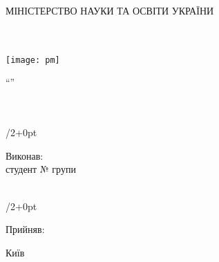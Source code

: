 
\newlength{\rightshift}
\setlength{\rightshift}{35pt}

\thispagestyle{empty}

{\sffamily
\begin{Center}
	{\LARGE{}МІНІСТЕРСТВО НАУКИ ТА ОСВІТИ УКРАЇНИ\\
	\university{}\\}
	{\Large\faculty{}\\\department{}}
\end{Center}

\vspace*{\fill}

\begin{Center}
	\texttt{[image: pm]}\\
\end{Center}

\vspace*{\fill}

\begin{Center}
	\Large
	\enquote{\subjectname}\\
	\jobtitle{} \prodnumber{}\\
	\proddate{}\\
\end{Center}

\vspace*{\fill}

\begin{adjustwidth}{\textwidth/2+\rightshift}{0pt}
	\begin{FlushLeft}
		\large
		Виконав:\\
		студент №\studentnumber{} групи \shortdepartment{} \groupnumber{} \shortuniversity{}\\
		\studentname{}\\
	\end{FlushLeft}
\end{adjustwidth}

\vspace{1cm}

\begin{adjustwidth}{\textwidth/2+\rightshift}{0pt}
	\begin{FlushLeft}
		\large
		Прийняв:\\
		\teachername{}
	\end{FlushLeft}
\end{adjustwidth}

\vspace*{\fill}

\begin{Center}
	Київ \the\year{}
\end{Center}
}

\pagebreak
\hypertarget{tocLink}{{\sffamily\tableofcontents}}
\pagebreak